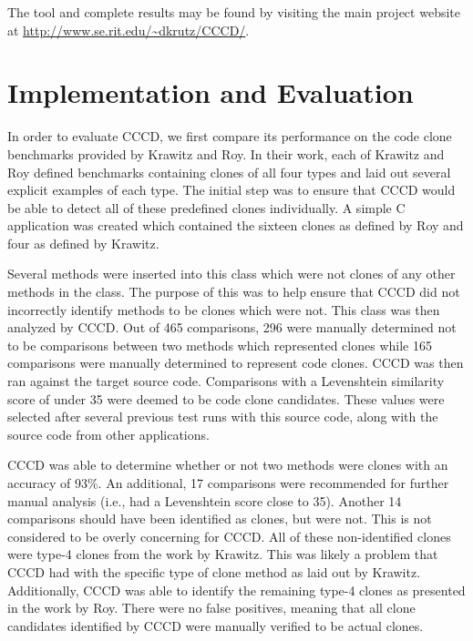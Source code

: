 \documentclass[conference]{IEEEtran}
\begin{document}
The tool and complete results may be found by visiting the main project website at \url{http://www.se.rit.edu/\~dkrutz/CCCD/}.

\section{Implementation and Evaluation}
\label{sec: implementationandeval}


In order to evaluate CCCD, we first compare its performance on the code clone benchmarks provided by Krawitz\cite{Kraw2012} and Roy\cite{Roy:2009:CEC:1530898.1531101}. In their work, each of Krawitz and Roy defined benchmarks containing clones of all four types and laid out several explicit examples of each type. The initial step was to ensure that CCCD would be able to detect all of these predefined clones individually. A simple C application was created which contained the sixteen clones as defined by Roy and four as defined by Krawitz. 

Several methods were inserted into this class which were not clones of any other methods in the class. The purpose of this was to help ensure that CCCD did not incorrectly identify methods to be clones which were not. This class was then analyzed by CCCD. Out of 465 comparisons, 296  were manually determined not to be comparisons between two methods which represented clones while 165 comparisons were manually determined to represent code clones. CCCD was then ran against the target source code. Comparisons with a Levenshtein similarity score of under 35 were deemed to be code clone candidates. These values were selected after several previous test runs with this source code, along with the source code from other applications.

CCCD was able to determine whether or not two methods were clones with an accuracy of 93\%. An additional, 17 comparisons were  recommended for further manual analysis (i.e., had a Levenshtein score close to 35). Another 14 comparisons should have been identified as clones, but were not. This is not considered to be overly concerning for CCCD. All of these non-identified clones were type-4 clones from the work by Krawitz. This was likely a problem that CCCD had with the specific type of clone method as laid out by Krawitz. Additionally, CCCD was able to identify the remaining type-4 clones as presented in the work by Roy. There were no false positives, meaning that all clone candidates identified by CCCD were manually verified to be actual clones. 
\end{document}
